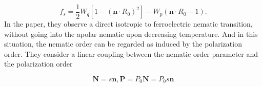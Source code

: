 \documentclass{article}
\begin{document}
\begin{dmath}
    f_s = \frac{1}{2}W_{q}\left[1- (\mathbf{n}\cdot R_{0})^2\right] - W_{p}(\mathbf{n}\cdot R_{0}-1).
\end{dmath}
In the paper, they observe a direct isotropic to ferroelectric nematic transition, without going into the apolar nematic upon decreasing temperature. And in this situation, the nematic order can be regarded as induced by the polarization order.
They consider a linear coupling between the nematic order parameter and the polarization order

\begin{equation}
    \mathbf{N}=s\mathbf{n}, \mathbf{P} = P_{0}\mathbf{N}=P_{0}s\mathbf{n}
\end{equation}
\end{document}
